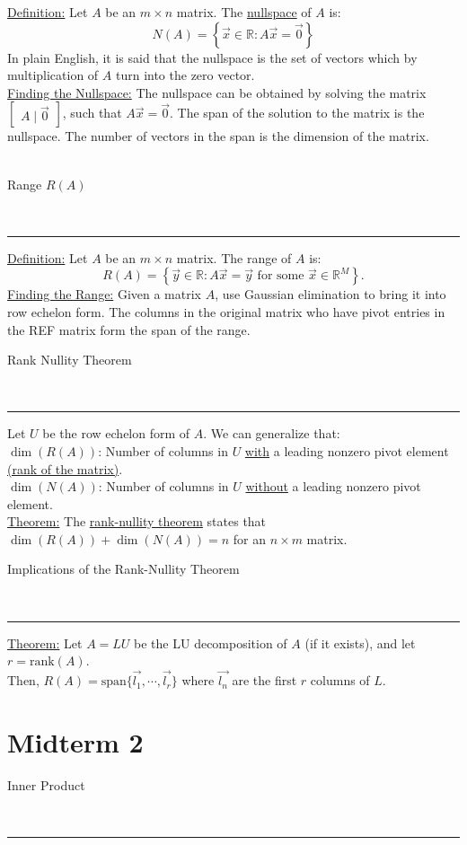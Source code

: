 \documentclass{article}
\newcommand{\header}[1]{\begin{large}\noindent #1\end{large}\\\rule{\textwidth}{0.5pt}}
\newcommand{\gap}{\medskip\\}
\begin{document}
\underline{Definition:} Let $A$ be an $m\times n$ matrix. The \underline{nullspace} of $A$ is:
\[
    N(A) = \left\{\vec{x} \in \mathbb{R} : A\vec{x} = \vec{0}\right\} 
\]
In plain English, it is said that the nullspace is the set of vectors which by multiplication
of $A$ turn into the zero vector.
\gap
\underline{Finding the Nullspace:} The nullspace can be obtained by solving the matrix
$\begin{bmatrix}
    A \mid \vec{0}
\end{bmatrix}$, such that $A\vec{x} = \vec{0}$. The span of the solution to the matrix
is the nullspace. The number of vectors in the span is the dimension of the matrix.
\\
\pagebreak
\\
\header{Range $R(A)$}

\underline{Definition:} Let $A$ be an $m\times n$ matrix. The range of $A$ is:
\[
    R(A) = \left\{\vec{y} \in \mathbb{R} : A\vec{x} = \vec{y} \textrm{ for some } \vec{x} \in \mathbb{R}^M \right\}.
\]
\underline{Finding the Range:} Given a matrix $A$, use Gaussian elimination to bring
it into row echelon form. The columns in the original matrix who have pivot entries
in the REF matrix form the span of the range.
\gap
\header{Rank Nullity Theorem}
Let $U$ be the row echelon form of $A$. We can generalize that:
\gap
$\dim(R(A))$: Number of columns in $U$ \underline{with} a leading nonzero pivot element \underline{(rank of the matrix)}.
\gap
$\dim(N(A))$: Number of columns in $U$ \underline{without} a leading nonzero pivot element.
\gap
\underline{Theorem:} The \underline{rank-nullity theorem} states that $\dim(R(A)) + \dim(N(A)) = n$
for an $n \times m$ matrix. 
\gap
\header{Implications of the Rank-Nullity Theorem}
\underline{Theorem:} Let $A=LU$ be the LU decomposition of $A$ (if it exists),
and let $r = \textrm{rank}(A)$.
\smallskip\\
Then, $R(A) = \textrm{span}\{\vec{l_1}, \cdots, \vec{l_r} \}$ where $\vec{l_n}$ are
the first $r$ columns of $L$.

\pagebreak

\section*{Midterm 2}

\header{Inner Product}
\end{document}

